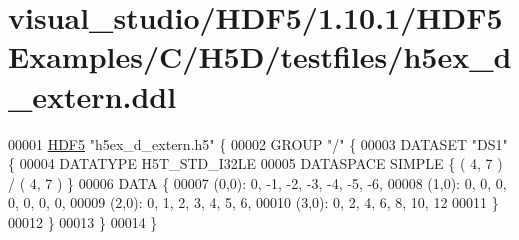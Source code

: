 \hypertarget{visual__studio_2_h_d_f5_21_810_81_2_h_d_f5_examples_2_c_2_h5_d_2testfiles_2h5ex__d__extern_8ddl_source}{}\section{visual\+\_\+studio/\+H\+D\+F5/1.10.1/\+H\+D\+F5\+Examples/\+C/\+H5\+D/testfiles/h5ex\+\_\+d\+\_\+extern.ddl}
\label{visual__studio_2_h_d_f5_21_810_81_2_h_d_f5_examples_2_c_2_h5_d_2testfiles_2h5ex__d__extern_8ddl_source}

\begin{DoxyCode}
00001 \hyperlink{namespace_h_d_f5}{HDF5} \textcolor{stringliteral}{"h5ex\_d\_extern.h5"} \{
00002 GROUP \textcolor{stringliteral}{"/"} \{
00003    DATASET \textcolor{stringliteral}{"DS1"} \{
00004       DATATYPE  H5T\_STD\_I32LE
00005       DATASPACE  SIMPLE \{ ( 4, 7 ) / ( 4, 7 ) \}
00006       DATA \{
00007       (0,0): 0, -1, -2, -3, -4, -5, -6,
00008       (1,0): 0, 0, 0, 0, 0, 0, 0,
00009       (2,0): 0, 1, 2, 3, 4, 5, 6,
00010       (3,0): 0, 2, 4, 6, 8, 10, 12
00011       \}
00012    \}
00013 \}
00014 \}
\end{DoxyCode}
